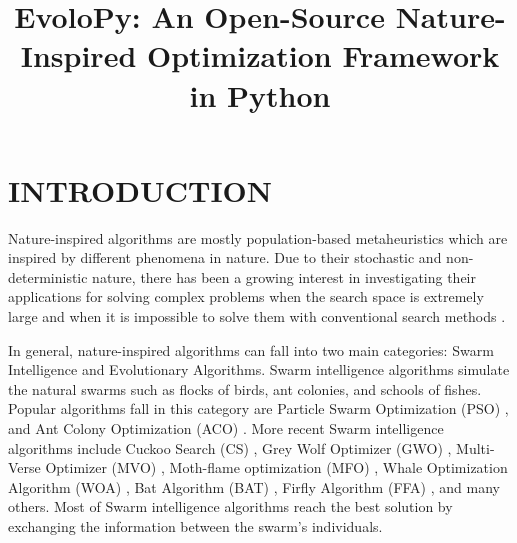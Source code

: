 \documentclass[a4paper,twoside]{article}
\begin{document}
\title{EvoloPy: An Open-Source Nature-Inspired Optimization Framework in Python}

\author{
}




\onecolumn \maketitle \normalsize \vfil
\section{\uppercase{Introduction}}

\label{sec:introduction}


Nature-inspired algorithms are mostly population-based metaheuristics which are inspired by different phenomena in nature. Due to their stochastic and non-deterministic nature, there has been a growing interest in investigating their applications for solving complex problems when the search space is extremely large and when it is impossible to solve them with conventional search methods \cite{Yang_2013}. 

In general, nature-inspired algorithms can fall into two main categories: Swarm Intelligence and Evolutionary Algorithms. Swarm intelligence algorithms simulate the natural swarms such as flocks of birds, ant colonies, and schools of fishes. Popular algorithms fall in this category are Particle Swarm Optimization (PSO) \cite{Kennedy95}, and Ant Colony Optimization (ACO) \cite{Koro_ec_2009}. More recent Swarm intelligence algorithms include Cuckoo Search (CS) \cite{Yang2009}, Grey Wolf Optimizer (GWO) \cite{Mirjalili201446}, Multi-Verse Optimizer (MVO) \cite{Mirjalili2016}, Moth-flame optimization (MFO) \cite{Mirjalili2015228}, Whale Optimization Algorithm (WOA) \cite{Mirjalili201651}, Bat Algorithm (BAT) \cite{Yang2010}, Firfly Algorithm (FFA) \cite{Yang2010FFA}, and many others. Most of Swarm intelligence algorithms reach the best solution by exchanging the information between the swarm's individuals. 
\end{document}
